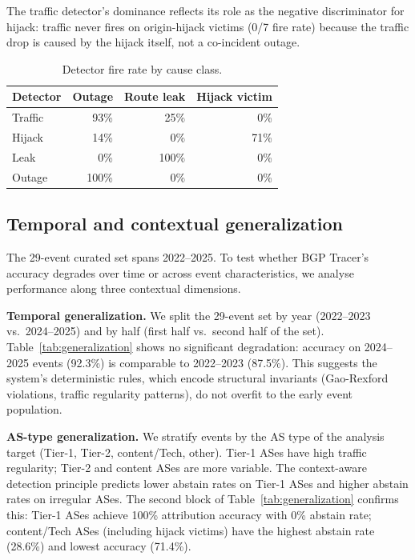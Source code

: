 The traffic detector's dominance reflects its role as the negative discriminator for hijack: traffic never fires on origin-hijack victims (0/7 fire rate) because the traffic drop is caused by the hijack itself, not a co-incident outage.

\begin{table}[t]
\centering
\caption{Detector fire rate by cause class.}
\label{tab:fire-rate}
\small
\begin{tabular}{l r r r}
\hline
\textbf{Detector} & \textbf{Outage} & \textbf{Route leak} & \textbf{Hijack victim} \\
\hline
Traffic & 93\% & 25\% & 0\% \\
Hijack & 14\% & 0\% & 71\% \\
Leak & 0\% & 100\% & 0\% \\
Outage & 100\% & 0\% & 0\% \\
\hline
\end{tabular}
\end{table}

\subsection{Temporal and contextual generalization}
The 29-event curated set spans 2022--2025. To test whether BGP Tracer's accuracy degrades over time or across event characteristics, we analyse performance along three contextual dimensions.

\textbf{Temporal generalization.} We split the 29-event set by year (2022--2023 vs.\ 2024--2025) and by half (first half vs.\ second half of the set). Table~\ref{tab:generalization} shows no significant degradation: accuracy on 2024--2025 events (92.3\%) is comparable to 2022--2023 (87.5\%). This suggests the system's deterministic rules, which encode structural invariants (Gao-Rexford violations, traffic regularity patterns), do not overfit to the early event population.

\textbf{AS-type generalization.} We stratify events by the AS type of the analysis target (Tier-1, Tier-2, content/Tech, other). Tier-1 ASes have high traffic regularity; Tier-2 and content ASes are more variable. The context-aware detection principle predicts lower abstain rates on Tier-1 ASes and higher abstain rates on irregular ASes. The second block of Table~\ref{tab:generalization} confirms this: Tier-1 ASes achieve 100\% attribution accuracy with 0\% abstain rate; content/Tech ASes (including hijack victims) have the highest abstain rate (28.6\%) and lowest accuracy (71.4\%).

